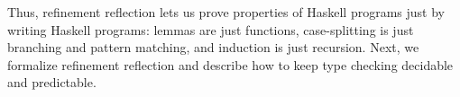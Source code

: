 %

Thus, refinement reflection lets us prove properties of Haskell programs
just by writing Haskell programs: lemmas are just functions, case-splitting
is just branching and pattern matching, and induction is just recursion.
%
Next, we formalize refinement reflection and describe
how to keep type checking decidable and predictable.
